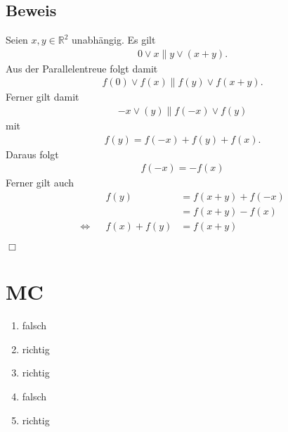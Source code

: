 \documentclass[11pt]{article}
\begin{document}
\subsection*{Beweis}
Seien $ x,y \in \mathbb{R}^2 $ unabhängig. Es gilt
\begin{equation*}
\begin{aligned}
0 \lor x \parallel y \lor (x+y).
\end{aligned}
\end{equation*}
Aus der Parallelentreue folgt damit
\begin{equation*}
\begin{aligned}
f(0) \lor f(x) \parallel f(y) \lor f(x+y).
\end{aligned}
\end{equation*}
Ferner gilt damit
\begin{equation*}
\begin{aligned}
-x \lor (y)\parallel f(-x) \lor f(y)
\end{aligned}
\end{equation*}
mit
\begin{equation*}
\begin{aligned}
f(y) = f(-x) + f(y) + f(x).
\end{aligned}
\end{equation*}
Daraus folgt
\begin{equation*}
\begin{aligned}
f(-x) = -f(x)
\end{aligned}
\end{equation*}
Ferner gilt auch
\begin{equation*}
\begin{aligned}
&&f(y) &= f(x+y) + f(-x)\\
&&&= f(x+y) - f(x)\\
\Leftrightarrow && f(x) + f(y) &= f(x+y)
\end{aligned}
\end{equation*}
\begin{flushright}
	$ \Box $
\end{flushright}
\section*{MC}
\begin{enumerate}
	\item falsch
	\item richtig
	\item richtig
	\item falsch
	\item richtig
\end{enumerate}
\end{document}
